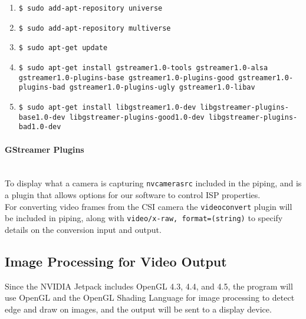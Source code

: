 \documentclass[letterpaper,10pt,serif,draftclsnofoot,onecolumn,compsoc,titlepage]{IEEEtran}
\begin{document}
	\begin{enumerate}
		\item\texttt{\$ sudo add-apt-repository universe} \\
		\item\texttt{\$ sudo add-apt-repository multiverse} \\
		\item\texttt{\$ sudo apt-get update} \\
		\item\texttt{\$ sudo apt-get install gstreamer1.0-tools gstreamer1.0-alsa 
			gstreamer1.0-plugins-base \newline gstreamer1.0-plugins-good 
			gstreamer1.0-plugins-bad gstreamer1.0-plugins-ugly \newline
			gstreamer1.0-libav} \\
		\item\texttt{\$ sudo apt-get install libgstreamer1.0-dev libgstreamer-plugins-base1.0-dev \newline
		libgstreamer-plugins-good1.0-dev libgstreamer-plugins-bad1.0-dev} \\
	\end{enumerate}

\paragraph{GStreamer Plugins}\mbox{} \\ 

To display what a camera is capturing \texttt{nvcamerasrc} included in the piping, 
and is a plugin that allows options for our software to control ISP properties. \\

For converting video frames from the CSI camera the \texttt{videoconvert} plugin will 
be included in piping, along with \texttt{video/x-raw, format=(string){}} to specify 
details on the conversion input and output. \\

\subsection{Image Processing for Video Output}

Since the  NVIDIA Jetpack includes OpenGL 4.3, 4.4, and 4.5, the program will use 
OpenGL and the OpenGL Shading Language for image processing to detect edge and draw on 
images, and the output will be sent to a display device. \\
\end{document}
